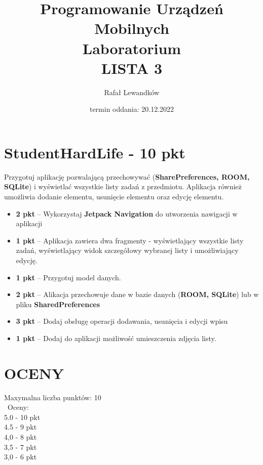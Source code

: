 \documentclass[a4paper]{article}
\title{Programowanie Urządzeń Mobilnych \\ Laboratorium \\ \textbf{LISTA 3}}
\author{Rafał Lewandków}
\date{termin oddania: 20.12.2022}
\begin{document}
\maketitle
    

\section*{StudentHardLife - 10 pkt}

Przygotuj aplikację pozwalającą przechowywać (\textbf{SharePreferences, ROOM, SQLite}) i wyświetlać wszystkie listy zadań z przedmiotu. Aplikacja również umożliwia dodanie elementu, usunięcie elementu oraz edycję elementu. 

\begin{itemize}
\item \textbf{2 pkt} -- Wykorzystaj \textbf{Jetpack Navigation} do utworzenia nawigacji w aplikacji

\item \textbf{1 pkt} -- Aplikacja zawiera dwa fragmenty - wyświetlający wszystkie listy zadań, wyświetlający widok szczegółowy wybranej listy i umożliwiający edycję.

\item \textbf{1 pkt} -- Przygotuj model danych.

\item \textbf{2 pkt} -- Alikacja przechowuje dane w bazie danych (\textbf{ROOM, SQLite}) lub w pliku \textbf{SharedPreferences}

\item \textbf{3 pkt} -- Dodaj obsługę operacji dodawania, usunięcia i edycji wpisu

\item \textbf{1 pkt} -- Dodaj do aplikacji możliwość umieszczenia zdjęcia listy.
\end{itemize}

\section*{OCENY}
Maxymalna liczba punktów: 10\\\
Oceny:\\
5.0 - 10 pkt\\
4.5 - 9 pkt\\
4,0 - 8 pkt\\
3,5 - 7 pkt\\
3,0 - 6 pkt
\end{document}
